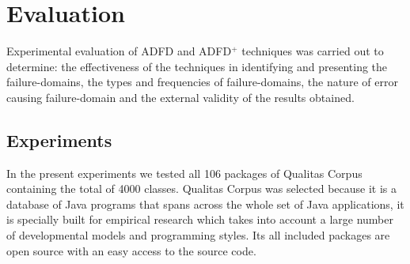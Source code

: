 \begin{enumerate}
%

%
%


\end{enumerate}




\section{Evaluation}
Experimental evaluation of ADFD and ADFD$^+$ techniques was carried out to determine: the effectiveness of the techniques in identifying and presenting the failure-domains, the types and frequencies of failure-domains, the nature of error causing failure-domain and the external validity of the results obtained. 


\subsection{Experiments}
In the present experiments we tested all 106 packages of Qualitas Corpus containing the total of 4000 classes. Qualitas Corpus was selected because it is a database of Java programs that spans across the whole set of Java applications, it is specially built for empirical research which takes into account a large number of developmental models and programming styles. Its all included packages are open source with an easy access to the source code.

